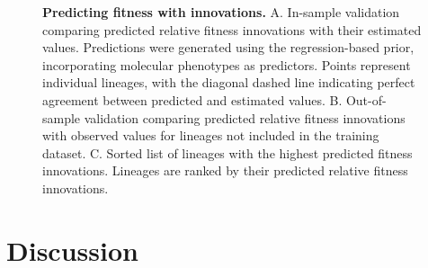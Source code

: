 \begin{figure}[h]
	\centering
	\caption{\textbf{Predicting fitness with innovations.}
	    A. In-sample validation comparing predicted relative fitness innovations with their estimated values.
	    Predictions were generated using the regression-based prior, incorporating molecular phenotypes as predictors.
	    Points represent individual lineages, with the diagonal dashed line indicating perfect agreement between predicted and estimated values.
	    B. Out-of-sample validation comparing predicted relative fitness innovations with observed values for lineages not included in the training dataset.
	    C. Sorted list of lineages with the highest predicted fitness innovations.
	    Lineages are ranked by their predicted relative fitness innovations.
	}
	\label{fig:predicting-fitness-with-innovations}
\end{figure}


\section{Discussion}

